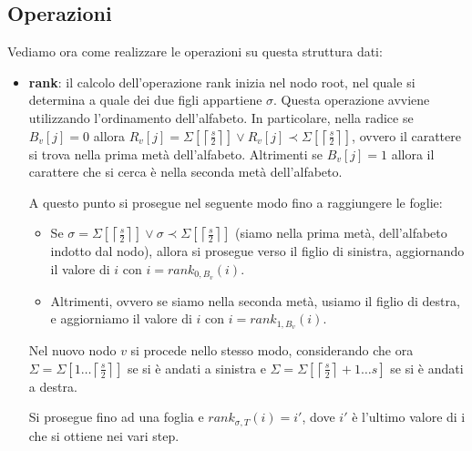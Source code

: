 \subsection{Operazioni}
Vediamo ora come realizzare le operazioni su questa struttura dati:
\begin{itemize}
    \item \textbf{rank}: il calcolo dell'operazione rank inizia nel nodo root,
          nel quale si determina a quale dei due figli appartiene $\sigma$.
          Questa operazione avviene utilizzando l'ordinamento dell'alfabeto. In
          particolare, nella radice se $B_v [j] = 0$ allora $R_v [j] = \Sigma
              \left[\left\lceil \frac{s}{2} \right\rceil\right] \lor R_v [j]
              \prec \Sigma \left[\left\lceil \frac{s}{2} \right\rceil\right]$,
          ovvero il carattere si trova nella prima metà dell'alfabeto. Altrimenti
          se $B_v[j] = 1$ allora il carattere che si cerca è nella seconda metà
          dell'alfabeto.

          A questo punto si prosegue nel seguente modo fino a raggiungere le foglie:
          \begin{itemize}
              \item Se $\sigma = \Sigma\left[\left\lceil \frac{s}{2} \right\rceil
                            \right] \lor \sigma \prec \Sigma\left[\left\lceil
                            \frac{s}{2} \right\rceil\right]$ (siamo nella prima
                    metà, dell'alfabeto indotto dal nodo), allora si prosegue
                    verso il figlio di sinistra, aggiornando il valore di $i$ con
                    $i = rank_{0,B_v}(i)$.
              \item Altrimenti, ovvero se siamo nella seconda metà, usiamo il
                    figlio di destra, e aggiorniamo il valore di $i$ con $i =
                        rank_{1,B_v}(i)$.
          \end{itemize}
          Nel nuovo nodo $v$ si procede nello stesso modo, considerando che ora
          $\Sigma = \Sigma \left[1 \dots \left\lceil \frac{s}{2} \right\rceil\right]$
          se si è andati a sinistra e $\Sigma = \Sigma\left[\left\lceil
                  \frac{s}{2} \right\rceil + 1 \dots s\right]$ se si è andati a
          destra.

          Si prosegue fino ad una foglia e $rank_{\sigma,T} (i) = i'$, dove $i'$
          è l'ultimo valore di i che si ottiene nei vari step.


\end{itemize}
